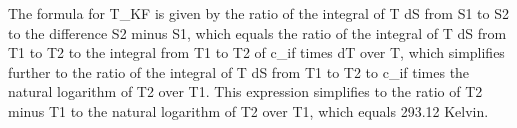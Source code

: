 The formula for T_KF is given by the ratio of the integral of T dS from S1 to S2 to the difference S2 minus S1, which equals the ratio of the integral of T dS from T1 to T2 to the integral from T1 to T2 of c_if times dT over T, which simplifies further to the ratio of the integral of T dS from T1 to T2 to c_if times the natural logarithm of T2 over T1. This expression simplifies to the ratio of T2 minus T1 to the natural logarithm of T2 over T1, which equals 293.12 Kelvin.